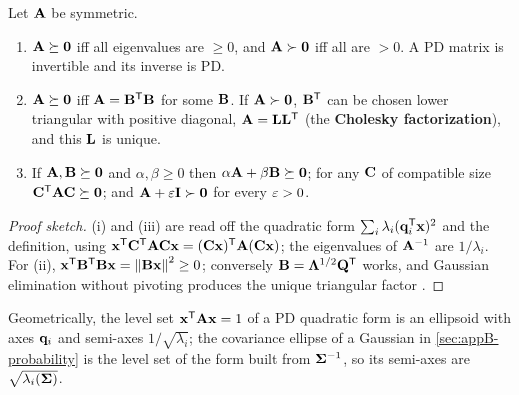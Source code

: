 \begin{proposition}
\label{thm:appB-psd-tests}
Let $\mathbf{A}$ be symmetric.
\begin{enumerate}[label=(\roman*)]
  \item $\mathbf{A} \succeq \mathbf{0}$ iff all eigenvalues are $\ge 0$, and $\mathbf{A} \succ \mathbf{0}$ iff all are $> 0$. A PD matrix is invertible and its inverse is PD.
  \item $\mathbf{A} \succeq \mathbf{0}$ iff $\mathbf{A} = \mathbf{B}^{\mathsf{T}}\mathbf{B}$ for some $\mathbf{B}$. If $\mathbf{A} \succ \mathbf{0}$, $\mathbf{B}^{\mathsf{T}}$ can be chosen lower triangular with positive diagonal, $\mathbf{A} = \mathbf{L}\mathbf{L}^{\mathsf{T}}$ (the \textbf{Cholesky factorization}), and this $\mathbf{L}$ is unique.
  \item If $\mathbf{A}, \mathbf{B} \succeq \mathbf{0}$ and $\alpha, \beta \ge 0$ then $\alpha\mathbf{A} + \beta\mathbf{B} \succeq \mathbf{0}$; for any $\mathbf{C}$ of compatible size $\mathbf{C}^{\mathsf{T}}\mathbf{A}\mathbf{C} \succeq \mathbf{0}$; and $\mathbf{A} + \varepsilon\mathbf{I} \succ \mathbf{0}$ for every $\varepsilon > 0$.
\end{enumerate}
\end{proposition}
\begin{proof}[Proof sketch]
(i) and (iii) are read off the quadratic form $\sum_i \lambda_i (\mathbf{q}_i^{\mathsf{T}}\mathbf{x})^2$ and the definition, using $\mathbf{x}^{\mathsf{T}}\mathbf{C}^{\mathsf{T}}\mathbf{A}\mathbf{C}\mathbf{x} = (\mathbf{C}\mathbf{x})^{\mathsf{T}}\mathbf{A}(\mathbf{C}\mathbf{x})$; the eigenvalues of $\mathbf{A}^{-1}$ are $1/\lambda_i$. For (ii), $\mathbf{x}^{\mathsf{T}}\mathbf{B}^{\mathsf{T}}\mathbf{B}\mathbf{x} = \left\lVert \mathbf{B}\mathbf{x} \right\rVert^2 \ge 0$; conversely $\mathbf{B} = \mathbf{\Lambda}^{1/2}\mathbf{Q}^{\mathsf{T}}$ works, and Gaussian elimination without pivoting produces the unique triangular factor \cite[Appendix~C]{boyd2004convex}. \qedhere
\end{proof}

Geometrically, the level set $\mathbf{x}^{\mathsf{T}}\mathbf{A}\mathbf{x} = 1$ of a PD quadratic
form is an ellipsoid with axes $\mathbf{q}_i$ and semi-axes $1/\sqrt{\lambda_i}$;
the covariance ellipse of a Gaussian in \cref{sec:appB-probability} is the
level set of the form built from $\mathbf{\Sigma}^{-1}$, so its semi-axes are
$\sqrt{\lambda_i(\mathbf{\Sigma})}$.

